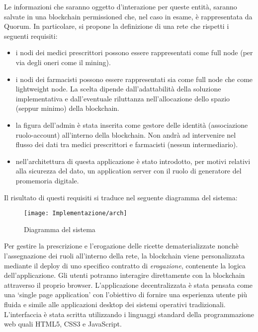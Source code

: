 Le informazioni che saranno oggetto d'interazione per queste entità, saranno salvate in una blockchain permissioned che, nel caso in esame, è rappresentata da Quorum. In particolare, si propone la definizione di una rete che rispetti i seguenti requisiti:
\begin{itemize}
	\item i nodi dei medici prescrittori possono essere rappresentati come full node (per via degli oneri come il mining).
	\item i nodi dei farmacisti possono essere rappresentati sia come full node che come lightweight node. La scelta dipende dall'adattabilità della soluzione implementativa e dall'eventuale riluttanza nell'allocazione dello spazio (seppur minimo) della blockchain.
	\item la figura dell'admin è stata inserita come gestore delle identità (associazione ruolo-account) all'interno della blockchain. Non andrà ad intervenire nel flusso dei dati tra medici prescrittori e farmacisti (nessun intermediario).
	\item nell'architettura di questa applicazione è stato introdotto, per motivi relativi alla sicurezza del dato, un application server con il ruolo di generatore del promemoria digitale.
\end{itemize}
Il risultato di questi requisiti si traduce nel seguente diagramma del sistema:
%
\begin{figure}[H]
	\centering
	\texttt{[image: Implementazione/arch]}
	\caption{Diagramma del sistema}
	\label{fig:diagramma del sistema}
\end{figure}
%
Per gestire la prescrizione e l'erogazione delle ricette dematerializzate nonchè l'assegnazione dei ruoli all'interno della rete, la blockchain viene personalizzata mediante il deploy di uno specifico contratto di \textit{erogazione}, contenente la logica dell'applicazione. Gli utenti potranno interagire direttamente con la blockchain attraverso il proprio browser. L'applicazione decentralizzata è stata pensata come una \enquote*{single page application} con l'obiettivo di fornire una esperienza utente più fluida e simile alle applicazioni desktop dei sistemi operativi tradizionali. L'interfaccia è stata scritta utilizzando i linguaggi standard della programmazione web quali HTML5, CSS3 e JavaScript.
%
